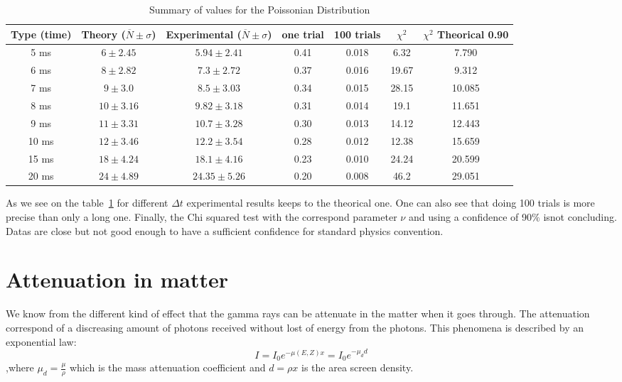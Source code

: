 \documentclass[a4paper,12pt,oneside]{article}
\begin{document}
\begin{table}[h!]
\centering
	\begin{tabular}{|c|c|c|c|c|c|c|}
		 \hline
		 Type (time) & Theory ($\overline{N}\pm\sigma$)& Experimental ($\overline{N}\pm\sigma$) & one trial & 100 trials & $\chi^2$  & $\chi^2$ Theorical 0.90\\
		\hline
		 5 ms & $6\pm 2.45$ & $5.94\pm 2.41$ & 0.41 & 0.018 & 6.32 & 7.790\\
		 6 ms & $8\pm 2.82$ & $7.3\pm 2.72$ & 0.37 & 0.016 & 19.67 & 9.312\\
		 7 ms & $9\pm 3.0$ & $8.5\pm 3.03$ & 0.34 & 0.015 & 28.15 & 10.085\\
		 8 ms & $10\pm 3.16$ & $9.82\pm 3.18$ & 0.31 & 0.014 & 19.1 & 11.651\\
		 9 ms & $11\pm 3.31$ & $10.7\pm 3.28$ & 0.30 & 0.013 & 14.12 & 12.443\\
		 10 ms & $12\pm 3.46$ & $12.2\pm 3.54$ & 0.28 & 0.012 & 12.38 & 15.659\\
		 15 ms & $18\pm 4.24$ & $18.1\pm 4.16$ & 0.23 & 0.010 & 24.24 & 20.599\\
		 20 ms & $24\pm 4.89$ & $24.35\pm 5.26$ & 0.20 & 0.008 & 46.2 & 29.051\\
		\hline
	\end{tabular}
	\caption{Summary of values for the Poissonian Distribution}
	\label{tab:poisson}
\end{table}

As we see on the table~\ref{tab:poisson} for different $\Delta t$ experimental results keeps to the theorical one. One can also see that doing 100 trials is more precise than only a long one. Finally, the Chi squared test with the correspond parameter $\nu$ and using a confidence of 90$\%$ isnot concluding. Datas are close but not good enough to have a sufficient confidence for standard physics convention.

\newpage
\section{Attenuation in matter}
We know from the different kind of effect that the gamma rays can be attenuate in the matter when it goes through. The attenuation correspond of a discreasing amount of photons received without lost of energy from the photons.
This phenomena is described by an exponential law:
$$I=I_0e^{-\mu(E,Z)x}=I_0 e^{-\mu_d d}$$
,where $\mu_d=\frac{\mu}{\rho}$ which is the mass attenuation coefficient and $d=\rho x$ is the area screen density.
\end{document}
